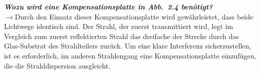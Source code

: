 \textbf{\textit{Wozu wird eine Kompensationsplatte in Abb.~2.4 benötigt?}}\\
$\rightarrow$Durch den Einsatz dieser Kompensationsplatte wird gewährleistet, dass beide Lichtwege 
identisch sind. Der Strahl, der zuerst transmittiert wird, legt im Vergleich zum zuerst 
reflektierten Strahl das dreifache der Strecke durch das Glas-Substrat des Strahlteilers zurück. 
Um eine klare Interferenz sicherzustellen, ist es erforderlich, im anderen Strahlengang eine 
Kompensationsplatte einzufügen, die die Strahldispersion ausgleicht.

